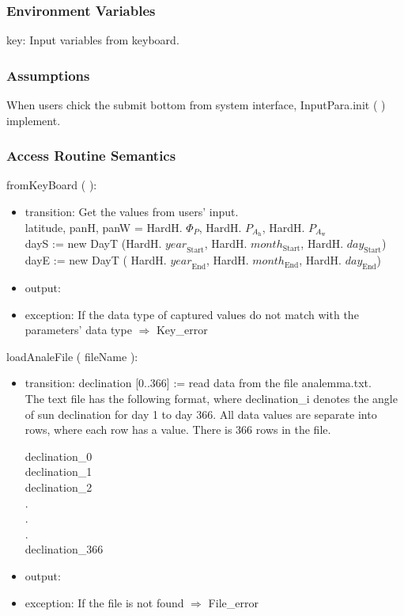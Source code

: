 \documentclass[12pt, titlepage]{article}
\begin{document}
\subsubsection{Environment Variables}
key: Input variables from keyboard.

\subsubsection{Assumptions}
When users chick the submit bottom from system interface, InputPara.init ( ) implement.

\subsubsection{ Access Routine Semantics}

\noindent  fromKeyBoard ( ):
\begin{itemize}
\item transition: Get the values from users' input.\\
latitude, panH, panW = HardH. $\Phi_P$, HardH. $P_{A_{\text{h}}}$, HardH. $P_{A_{\text{w}}}$\\

dayS := new DayT (HardH. $\mathit{year}_\text{Start}$, HardH. $\mathit{month}_\text{Start}$, HardH. $\mathit{day}_\text{Start}$) \\

dayE :=  new DayT ( HardH. $\mathit{year}_\text{End}$, HardH. $\mathit{month}_\text{End}$, HardH. $\mathit{day}_\text{End}$)\\
\item output:
\item exception: If the data type of captured values do not match with the parameters' data type $\Rightarrow$ Key\_error
\end{itemize}



\noindent  loadAnaleFile ( fileName ):
\begin{itemize}
\item transition: declination [0..366] := read data from the file analemma.txt.\\
The text file has the following format, where declination\_i denotes the angle of sun declination for day 1 to day 366.
All data values are separate into rows, where each row has a value. There is 366 rows in the file.
\begin{center}
declination\_0\\
declination\_1\\
declination\_2\\
.\\
.\\
.\\
declination\_366\\
\end{center}

\item output:
\item exception: If the file is not found $\Rightarrow$ File\_error
\end{itemize}
\end{document}
